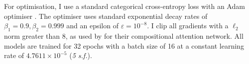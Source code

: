 For optimisation, I use a standard categorical cross-entropy loss with an Adam optimiser \cite{kingma2014adam}. The optimiser uses standard exponential decay rates of \(\beta_1 = 0.9, \beta_2 = 0.999\) and an epsilon of \(\varepsilon = 10^{-8}\). I clip all gradients with a \(\ell_2\) norm greater than 8, as used by \citeauthor{hudson2018compositional} for their compositional attention network. All models are trained for 32 epochs with a batch size of 16 at a constant learning rate of \(4.7611 \times 10^{-5}\) (\textit{5 s.f.}).
